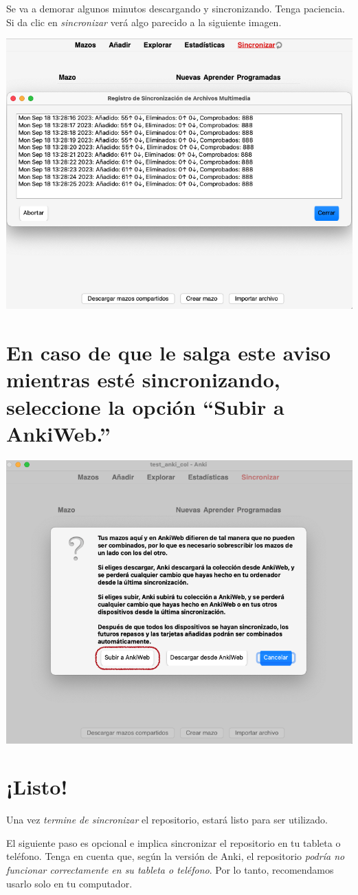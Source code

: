 \documentclass[
]{book}
\begin{document}
Se va a demorar algunos minutos descargando y sincronizando. Tenga paciencia. Si da clic en \emph{sincronizar} verá algo parecido a la siguiente imagen.

\includegraphics[width=0.6\linewidth]{images/reposit_sp/sincronizar}

\section*{En caso de que le salga este aviso mientras esté sincronizando, seleccione la opción ``Subir a AnkiWeb.''}\label{en-caso-de-que-le-salga-este-aviso-mientras-estuxe9-sincronizando-seleccione-la-opciuxf3n-subir-a-ankiweb.}

\includegraphics[width=0.6\linewidth]{images/reposit_sp/subir_a_anki}

\section{¡Listo!}\label{listo}

Una vez \emph{termine de sincronizar} el repositorio, estará listo para ser utilizado.

El siguiente paso es opcional e implica sincronizar el repositorio en tu tableta o teléfono. Tenga en cuenta que, según la versión de Anki, el repositorio \emph{podría no funcionar correctamente en su tableta o teléfono}. Por lo tanto, recomendamos usarlo solo en tu computador.
\end{document}
